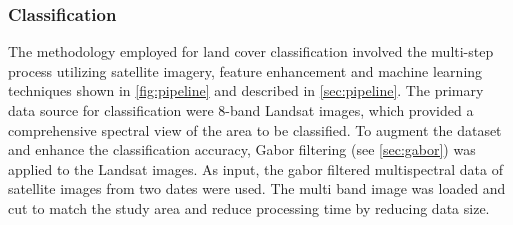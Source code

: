 \documentclass[12pt,a4paper, english,twoside]{article}
\begin{document}
    \subsubsection{Classification }\label{sec:classification}
      The methodology employed for land cover classification involved the multi-step process utilizing satellite imagery, feature enhancement and machine learning techniques shown in \cref{fig:pipeline} and described in \cref{sec:pipeline}.
      The primary data source for classification were 8-band Landsat images, which provided a comprehensive spectral view of the area to be classified.
      To augment the dataset and enhance the classification accuracy, Gabor filtering (see \cref{sec:gabor}) was applied to the Landsat images.
      As input, the gabor filtered multispectral data of satellite images from two dates were used.
      The multi band image was loaded and cut to match the study area and reduce processing time by reducing data size.  
\end{document}
